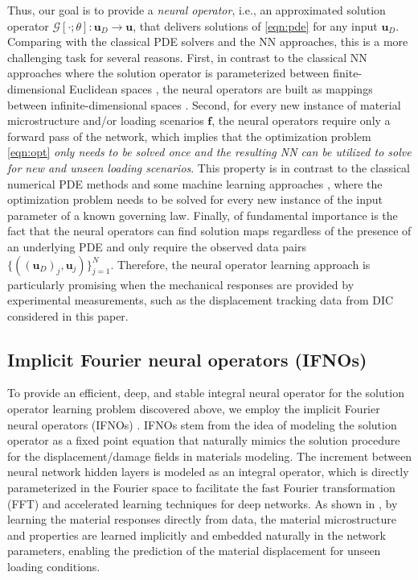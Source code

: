 \documentclass[twocolumn,10pt]{asme2ej}
\renewcommand{\~}{\tilde}
\renewcommand{\-}{\bar}
\newcommand{\8}{\infty}
\numberwithin{equation}{section}
\newcommand{\mcG}{\mathcal{G}}
\def \fb{\bm{f}}
\def \ub{\bm{u}}
\begin{document}
Thus, our goal is to provide a {\it neural operator}, i.e., an approximated solution operator $\mcG[\cdot;\theta]:\ub_D\rightarrow \ub$, that delivers solutions of \eqref{eqn:pde} for any input $\ub_D$. Comparing with the classical PDE solvers and the NN approaches, this is a more challenging task for several reasons. First, in contrast to the classical NN approaches where the solution operator is parameterized between finite-dimensional Euclidean spaces \cite{guo2016convolutional,zhu2018bayesian,adler2017solving,bhatnagar2019prediction,khoo2021solving}, the neural operators are built as mappings between infinite-dimensional spaces %
\cite{li2020neural,li2020fourier,you2022nonlocal}. Second, for every new instance of material microstructure and/or loading scenarios $\fb$, the neural operators require only a forward pass of the network, which implies that the optimization problem \eqref{eqn:opt} \textit{only needs to be solved once and the resulting NN can be utilized to solve for new and unseen loading scenarios}. This property is in contrast to the classical numerical PDE methods \cite{leveque2007finite,zienkiewicz1977finite,karniadakis2005spectral} 
and some machine learning approaches  \cite{raissi2019physics,weinan2018deep,bar2019unsupervised,smith2020eikonet,pan2020physics}, where the optimization problem needs to be solved for every new instance of the input parameter of a known governing law. 
Finally, of fundamental importance is the fact that the neural operators can find solution maps regardless of the presence of an underlying PDE and only require the observed data pairs $\{((\ub_D)_j,\ub_j)\}_{j=1}^N$. Therefore, the neural operator learning approach is particularly promising when the mechanical responses are provided by experimental measurements, such as the displacement tracking data from DIC considered in this paper.


\subsection{Implicit Fourier neural operators (IFNOs)}\label{sec:ifno}



To provide an efficient, deep, and stable integral neural operator for the solution operator learning problem discovered above, we employ the implicit Fourier neural operators (IFNOs) \cite{you2022learning}. IFNOs stem from the idea of modeling the solution operator as a fixed point equation that naturally mimics the solution procedure for the displacement/damage fields in materials modeling. The increment between neural network hidden layers is modeled as an integral operator, which is directly parameterized in the Fourier space to facilitate the fast Fourier transformation (FFT) and accelerated learning techniques for deep networks. As shown in \cite{you2022learning}, by learning the material responses directly from data, the material microstructure and properties are learned implicitly and embedded naturally in the network parameters, enabling the prediction of the material displacement for unseen loading conditions.
\end{document}
